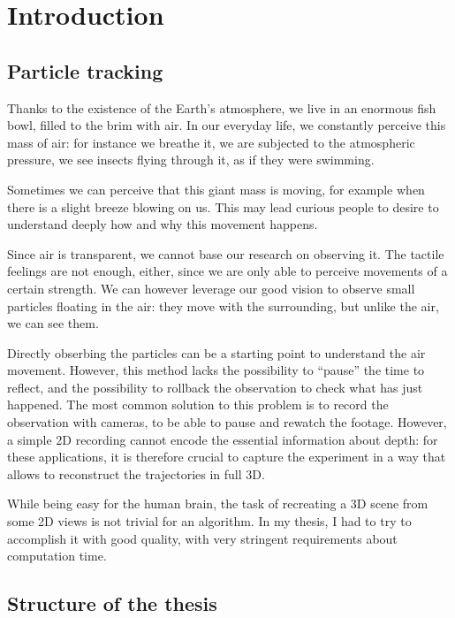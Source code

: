 \chapter{Introduction}
\label{chap:intr}

\section{Particle tracking}

Thanks to the existence of the Earth's atmosphere, we live in an enormous fish bowl, filled to the brim with air.
In our everyday life, we constantly perceive this mass of air: for instance we breathe it, we are subjected to the atmospheric pressure, we see insects flying through it, as if they were swimming.

Sometimes we can perceive that this giant mass is moving, for example when there is a slight breeze blowing on us.
This may lead curious people to desire to understand deeply how and why this movement happens.

Since air is transparent, we cannot base our research on observing it.
The tactile feelings are not enough, either, since we are only able to perceive movements of a certain strength.
We can however leverage our good vision to observe small particles floating in the air: they move with the surrounding, but unlike the air, we can see them.

Directly obserbing the particles can be a starting point to understand the air movement.
However, this method lacks the possibility to ``pause'' the time to reflect, and the possibility to rollback the observation to check what has just happened.
The most common solution to this problem is to record the observation with cameras, to be able to pause and rewatch the footage.
However, a simple 2D recording cannot encode the essential information about depth: for these applications, it is therefore crucial to capture the experiment in a way that allows to reconstruct the trajectories in full 3D.

While being easy for the human brain, the task of recreating a 3D scene from some 2D views is not trivial for an algorithm.
In my thesis, I had to try to accomplish it with good quality, with very stringent requirements about computation time.

\section{Structure of the thesis}
